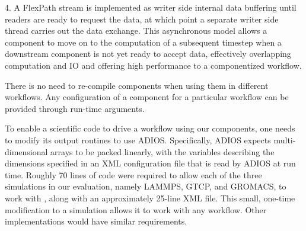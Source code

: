 4. A FlexPath stream is implemented as
writer side internal data buffering 
until readers are ready to request the data,
at which point a separate writer side thread carries out the data exchange.
This asynchronous model allows a 
\sys component to move on to the computation
of a subsequent timestep when a downstream
component is not yet ready to accept data,
effectively overlapping computation and IO
and offering high performance to a componentized workflow.

There is no need to re-compile \sys components when using them
in different workflows. Any configuration
of a component for a particular workflow
can be provided through run-time arguments.

To enable a scientific code to drive a workflow using our
\sys components, one needs to modify its output routines to use ADIOS.
Specifically, ADIOS expects multi-dimensional
arrays to be packed linearly, with the variables
describing the dimensions
specified in an XML configuration file
that is read by ADIOS at run time.
Roughly 70 lines of code were required
to allow each of the three simulations
in our evaluation, namely LAMMPS, GTCP, and GROMACS,
to work with \sys,
along with an approximately 25-line
XML file.
This small, one-time modification to a simulation allows it to work with any
\sys workflow. Other implementations would have similar requirements.
